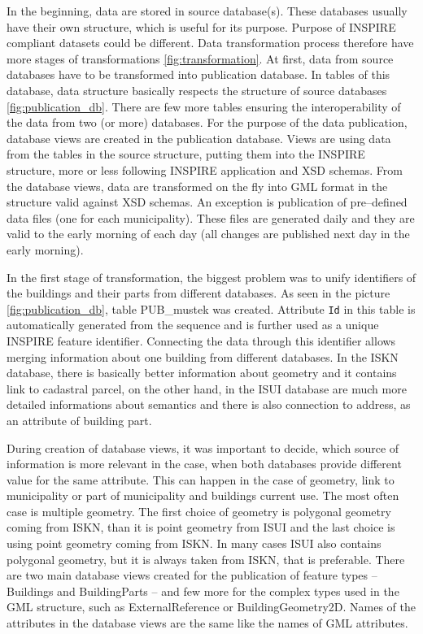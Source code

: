 \documentclass[eprint]{actapoly}
\begin{document}
In the beginning, data are stored in source database(s). These databases usually have their own structure, which is useful for its purpose. Purpose of INSPIRE compliant datasets could be different. Data transformation process therefore have more stages of transformations \ref{fig:transformation}. At first, data from source databases have to be transformed into publication database. In tables of this database, data structure basically respects the structure of source databases \ref{fig:publication_db}. There are few more tables ensuring the interoperability of the data from two (or more) databases. For the purpose of the data publication, database views are created in the publication database. Views are using data from the tables in the source structure, putting them into the INSPIRE structure, more or less following INSPIRE application and XSD schemas. From the database views, data are transformed on the fly into GML format in the structure valid against XSD schemas. An exception is publication of pre--defined data files (one for each municipality). These files are generated daily and they are valid to the early morning of each day (all changes are published next day in the early morning).

In the first stage of transformation, the biggest problem was to unify identifiers of the buildings and their parts from different databases. As seen in the picture \ref{fig:publication_db}, table PUB\_mustek was created. Attribute \texttt{Id} in this table is automatically generated from the sequence and is further used as a unique INSPIRE feature identifier. Connecting the data through this identifier allows merging information about one building from different databases. In the ISKN database, there is basically better information about geometry and it contains link to cadastral parcel, on the other hand, in the ISUI database are much more detailed informations about semantics and there is also connection to address, as an attribute of building part. 

During creation of database views, it was important to decide, which source of information is more relevant in the case, when both databases provide different value for the same attribute. This can happen in the case of geometry, link to municipality or part of municipality and buildings current use. The most often case is multiple geometry. The first choice of geometry is polygonal geometry coming from ISKN,  than it is point geometry from ISUI and the last choice is using point geometry coming from ISKN. In many cases ISUI also contains polygonal geometry, but it is always taken from ISKN, that is preferable. There are two main database views created for the publication of feature types -- Buildings and BuildingParts -- and few more for the complex types used in the GML structure, such as ExternalReference or BuildingGeometry2D. Names of the attributes in the database views are the same like the names of GML attributes.
\end{document}
